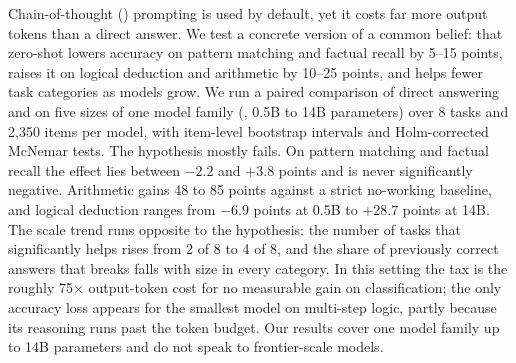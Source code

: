 Chain-of-thought (\CoT) prompting is used by default, yet it costs far more output tokens than a direct answer.
We test a concrete version of a common belief: that zero-shot \CoT lowers accuracy on pattern matching and factual recall by 5--15 points, raises it on logical deduction and arithmetic by 10--25 points, and helps fewer task categories as models grow.
We run a paired comparison of direct answering and \CoT on five sizes of one model family (\qwen, 0.5B to 14B parameters) over 8 tasks and 2,350 items per model, with item-level bootstrap intervals and Holm-corrected McNemar tests.
The hypothesis mostly fails.
On pattern matching and factual recall the \CoT effect lies between $-2.2$ and $+3.8$ points and is never significantly negative.
Arithmetic gains 48 to 85 points against a strict no-working baseline, and logical deduction ranges from $-6.9$ points at 0.5B to $+28.7$ points at 14B.
The scale trend runs opposite to the hypothesis: the number of tasks that \CoT significantly helps rises from 2 of 8 to 4 of 8, and the share of previously correct answers that \CoT breaks falls with size in every category.
In this setting the tax is the roughly 75$\times$ output-token cost for no measurable gain on classification; the only accuracy loss appears for the smallest model on multi-step logic, partly because its reasoning runs past the token budget.
Our results cover one model family up to 14B parameters and do not speak to frontier-scale models.
